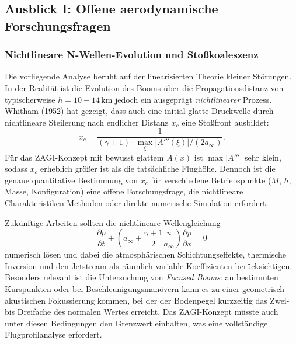 ﻿\documentclass[12pt,a4paper]{article}
\theoremstyle{definition}
\theoremstyle{remark}
\newcommand{\pdd}[2]{\frac{\partial #1}{\partial #2}}
\begin{document}
\subsection{Ausblick I: Offene aerodynamische Forschungsfragen}
\label{sec:ausblick_aero}

\subsubsection{Nichtlineare N-Wellen-Evolution und Stoßkoaleszenz}

Die vorliegende Analyse beruht auf der linearisierten Theorie kleiner Störungen. In der
Realität ist die Evolution des Booms über die Propagationsdistanz von typischerweise
$h = 10{-}14\,\text{km}$ jedoch ein ausgeprägt \emph{nichtlinearer} Prozess. Whitham (1952)
hat gezeigt, dass auch eine initial glatte Druckwelle durch nichtlineare Steilerung nach
endlicher Distanz $x_c$ eine Stoßfront ausbildet:
\begin{equation}
  x_c = \frac{1}{(\gamma + 1) \cdot \max_\xi |A'''(\xi)| / (2 a_\infty)}.
  \label{eq:steilungslaenge}
\end{equation}
Für das ZAGI-Konzept mit bewusst glattem $A(x)$ ist $\max|A'''|$ sehr klein, sodass $x_c$
erheblich größer ist als die tatsächliche Flughöhe. Dennoch ist die genaue quantitative
Bestimmung von $x_c$ für verschiedene Betriebspunkte ($M$, $h$, Masse, Konfiguration) eine
offene Forschungsfrage, die nichtlineare Charakteristiken-Methoden oder direkte numerische
Simulation erfordert.

Zukünftige Arbeiten sollten die nichtlineare Wellengleichung
\begin{equation}
  \pdd{p}{t} + \left(a_\infty + \frac{\gamma+1}{2}\frac{u}{a_\infty}\right) \pdd{p}{x} = 0
  \label{eq:nichtlinear_welle}
\end{equation}
numerisch lösen und dabei die atmosphärischen Schichtungseffekte, thermische Inversion
und den Jetstream als räumlich variable Koeffizienten berücksichtigen. Besonders relevant
ist die Untersuchung von \emph{Focused Booms}: an bestimmten Kurspunkten oder bei
Beschleunigungsmanövern kann es zu einer geometrisch-akustischen Fokussierung kommen,
bei der der Bodenpegel kurzzeitig das Zwei- bis Dreifache des normalen Wertes erreicht.
Das ZAGI-Konzept müsste auch unter diesen Bedingungen den Grenzwert einhalten, was
eine vollständige Flugprofilanalyse erfordert.
\end{document}
